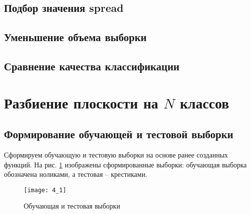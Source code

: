 \subsection{Подбор значения spread}


\subsection{Уменьшение объема выборки}


\subsection{Сравнение качества классификации}


\newpage

\section{Разбиение плоскости на $N$ классов}

\subsection{Формирование обучающей и тестовой выборки}

Сформируем обучающую и тестовую выборки на основе ранее созданных функций. На рис. \ref{fig:4_1} изображены сформированные выборки: обучающая выборка обозначена ноликами, а тестовая -- крестиками.
\begin{figure}[H]
\begin{center}
	\texttt{[image: 4\_1]}
	\caption{Обучающая и тестовая выборки}
	\label{fig:4_1}
\end{center}
\end{figure}

